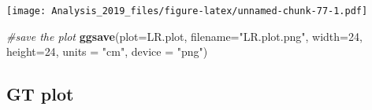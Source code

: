 \documentclass[
]{article}
\newenvironment{Shaded}{\begin{snugshade}}{\end{snugshade}}
\newcommand{\CommentTok}[1]{\textcolor[rgb]{0.56,0.35,0.01}{\textit{#1}}}
\newcommand{\DataTypeTok}[1]{\textcolor[rgb]{0.13,0.29,0.53}{#1}}
\newcommand{\DecValTok}[1]{\textcolor[rgb]{0.00,0.00,0.81}{#1}}
\newcommand{\KeywordTok}[1]{\textcolor[rgb]{0.13,0.29,0.53}{\textbf{#1}}}
\newcommand{\NormalTok}[1]{#1}
\newcommand{\StringTok}[1]{\textcolor[rgb]{0.31,0.60,0.02}{#1}}
\begin{document}
\texttt{[image: Analysis\_2019\_files/figure-latex/unnamed-chunk-77-1.pdf]}

\begin{Shaded}
\begin{Highlighting}[]
\CommentTok{#save the plot}
\KeywordTok{ggsave}\NormalTok{(}\DataTypeTok{plot=}\NormalTok{LR.plot,}
       \DataTypeTok{filename=}\StringTok{"LR.plot.png"}\NormalTok{,}
       \DataTypeTok{width=}\DecValTok{24}\NormalTok{,}
       \DataTypeTok{height=}\DecValTok{24}\NormalTok{,}
       \DataTypeTok{units =} \StringTok{"cm"}\NormalTok{,}
       \DataTypeTok{device =} \StringTok{"png"}\NormalTok{)}
\end{Highlighting}
\end{Shaded}

\newpage

\hypertarget{gt-plot}{%
\subsection{GT plot}\label{gt-plot}}
\end{document}
